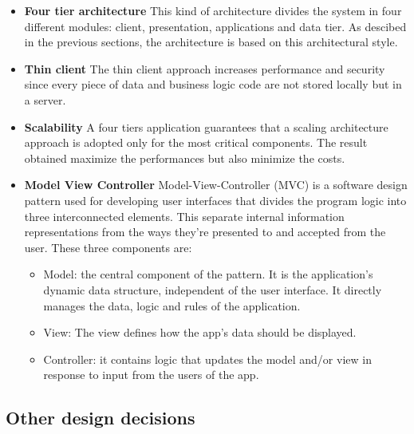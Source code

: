 \documentclass[table, 12pt]{article}
\begin{document}
    \begin{itemize}
        \item \textbf{Four tier architecture} \newline
              This kind of architecture divides the system in four different modules: client, presentation, applications and data tier.
              As descibed in the previous sections, the architecture is based on this architectural style.
        \item \textbf{Thin client} \newline
              The thin client approach increases performance and security since every piece of data and business logic code are not stored locally but in a server.
        \item \textbf{Scalability} \newline
              A four tiers application guarantees that a scaling architecture approach is adopted only for the most critical components.
              The result obtained maximize the performances but also minimize the costs.
        \item \textbf{Model View Controller} \newline
              Model-View-Controller \cite{mvc} (MVC) is a software design pattern used for developing user interfaces that divides the program logic into three interconnected elements.
              This separate internal information representations from the ways they're presented to and accepted from the user.
              These three components are:
              \begin{itemize}
                  \item Model: the central component of the pattern. It is the application's dynamic data structure, independent of the user interface. It directly manages the data, logic and rules of the application.
                  \item View: The view defines how the app's data should be displayed.
                  \item Controller: it contains logic that updates the model and/or view in response to input from the users of the app. 
              \end{itemize}
    \end{itemize}

\newpage

\subsection{Other design decisions}
\label{other_design_decisions}
\end{document}
